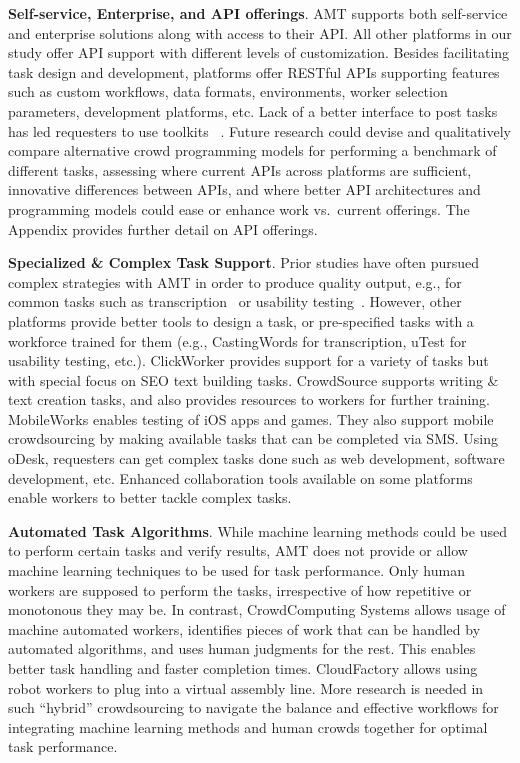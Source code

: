 \documentclass{sigchi}
\begin{document}
{\bf Self-service, Enterprise, and API offerings}. AMT supports both self-service and enterprise solutions along with access to their API. All other platforms in our study offer API support with different levels of customization. Besides facilitating task design and development,  platforms offer RESTful APIs supporting features such as custom workflows, data formats, environments, worker selection parameters, development platforms, etc. Lack of a better interface to post tasks \cite{panos2010pleatoamazon} has led requesters to use toolkits ~\cite{little2009turkit,kittur2011crowdforge}. Future research could devise and qualitatively compare alternative crowd programming models for performing a benchmark of different tasks, assessing where current APIs across platforms are sufficient, innovative differences between APIs, and where better API architectures and programming models could ease or enhance work vs.\ current offerings.  The Appendix provides further detail on API offerings. 


{\bf Specialized \& Complex Task Support}. Prior studies have often pursued complex strategies with AMT in order to produce quality output, e.g., for common tasks such as transcription~\cite{novotney2010cheap} or usability testing~\cite{Liu12-asist}. However, other platforms 
provide better tools to design a task, or pre-specified tasks with a workforce trained for them (e.g., CastingWords for transcription, uTest for usability testing, etc.). ClickWorker provides support for a variety of tasks but with special focus on SEO text building tasks. CrowdSource supports writing \& text creation tasks, and also provides resources to workers for further training. MobileWorks enables testing of iOS apps and games. They also support mobile crowdsourcing by making available tasks that can be completed via SMS. 
Using oDesk, requesters can get complex tasks done such as web development, software development, etc. Enhanced collaboration tools available on some platforms enable workers to better tackle complex tasks.


{\bf Automated Task Algorithms}. While machine learning methods could be used to perform certain tasks and verify results, AMT does not provide or allow machine learning techniques to be used for task performance. Only human workers are supposed to perform the tasks, irrespective of how repetitive or monotonous they may be. In contrast, CrowdComputing Systems allows usage of  machine automated workers,  identifies pieces of work that can be handled by automated algorithms, and uses human judgments for the rest. This enables better task handling and faster completion times. CloudFactory allows using robot workers to plug into a virtual assembly line. More research is needed in such ``hybrid'' crowdsourcing to navigate the balance and effective workflows for integrating machine learning methods and human crowds together for optimal task performance.
\end{document}
